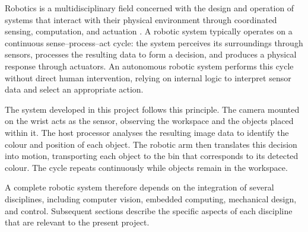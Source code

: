 Robotics is a multidisciplinary field concerned with the design 
and operation of systems that interact with their physical 
environment through coordinated sensing, computation, and 
actuation \cite{craig2005}. A robotic system typically operates 
on a continuous sense--process--act cycle: the system perceives 
its surroundings through sensors, processes the resulting data to 
form a decision, and produces a physical response through 
actuators. An autonomous robotic system performs this cycle 
without direct human intervention, relying on internal logic 
to interpret sensor data and select an appropriate action.

The system developed in this project follows this principle. The 
camera mounted on the wrist acts as the sensor, observing the 
workspace and the objects placed within it. The host processor 
analyses the resulting image data to identify the colour and 
position of each object. The robotic arm then translates this 
decision into motion, transporting each object to the bin that 
corresponds to its detected colour. The cycle repeats 
continuously while objects remain in the workspace.

A complete robotic system therefore depends on the integration of 
several disciplines, including computer vision, embedded computing, 
mechanical design, and control. Subsequent sections describe the 
specific aspects of each discipline that are relevant to the 
present project.